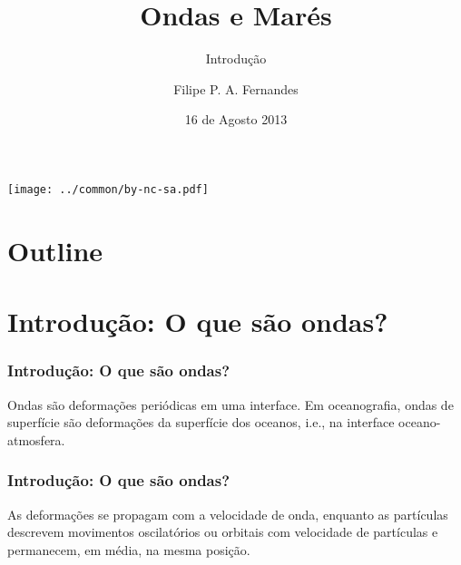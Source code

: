 
\title[Aula 02]{Ondas e Marés}
\subtitle{Introdução}
\author[Filipe Fernandes]{Filipe P. A. Fernandes}
\date[Agosto 2013]{16 de Agosto 2013}




\begin{frame}[plain]
  \titlepage
  \begin{center}
    \texttt{[image: ../common/by-nc-sa.pdf]}
  \end{center}
\end{frame}

\section*{Outline}
\begin{frame}
\tableofcontents
\end{frame}

\section{{Introdução: O que são ondas?}}

\begin{frame}
\frametitle{Introdução: O que são ondas?}
    \begin{block}{}
      Ondas são deformações periódicas em uma interface.  Em oceanografia, ondas
      de superfície são deformações da superfície dos oceanos, i.e., na
      interface oceano-atmosfera.
    \end{block}
\end{frame}


\begin{frame}
  \frametitle{Introdução: O que são ondas?}
  \begin{block}{}
    As deformações se propagam com a velocidade de onda,
    enquanto as partículas descrevem movimentos oscilatórios ou orbitais com
    velocidade de partículas e permanecem, em média, na mesma posição.
  \end{block}
\end{frame}


